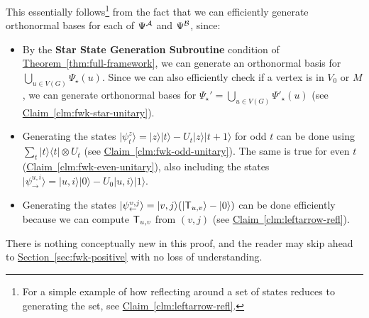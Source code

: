 \documentclass{article}
\renewcommand{\sec}[1]{\hyperref[sec:#1]{Section~\ref*{sec:#1}}}
\newcommand{\thm}[1]{\hyperref[thm:#1]{Theorem~\ref*{thm:#1}}}
\newcommand{\clm}[1]{\hyperref[clm:#1]{Claim~\ref*{clm:#1}}}
\def\ket#1{{\lvert}#1\rangle}
\def\bra#1{{\langle}#1\rvert}
\renewcommand{\>}{\rangle}
\newcommand{\<}{\langle}
\renewcommand{\(}{\left(}
\renewcommand{\)}{\right)}
\begin{document}
\noindent This essentially follows\footnote{For a simple example of how reflecting around a set of states reduces to generating the set, see \clm{leftarrow-refl}.} from the fact that we can efficiently generate orthonormal bases for each of $\Psi^{\cal A}$ and $\Psi^{\cal B}$, since:
\begin{itemize}
\item By the \textbf{Star State Generation Subroutine} condition of \thm{full-framework}, we can generate an orthonormal basis for $\bigcup_{u\in V(G)}\Psi_\star(u)$. Since we can also efficiently check if a vertex is in $V_0$ or $M$, we can generate orthonormal bases for $\Psi_\star'=\bigcup_{u\in V(G)}\Psi'_\star(u)$ (see \clm{fwk-star-unitary}).
\item Generating the states $\ket{\psi_t^z}=\ket{z}\ket{t}-U_t\ket{z}\ket{t+1}$ for odd $t$ can be done using $\sum_{t}\ket{t}\bra{t}\otimes U_t$ (see \clm{fwk-odd-unitary}). The same is true for even $t$ (\clm{fwk-even-unitary}), also including the states $\ket{\psi_{\rightarrow}^{u,i}}=\ket{u,i}\ket{0}-U_0\ket{u,i}\ket{1}$.
\item Generating the states $\ket{\psi_{\leftarrow}^{v,j}}=\ket{v,j}(\ket{{\sf T}_{u,v}}-\ket{0})$ can be done efficiently because we can compute ${\sf T}_{u,v}$ from $(v,j)$ (see \clm{leftarrow-refl}). 
\end{itemize}
There is nothing conceptually new in this proof, and the reader may skip ahead to \sec{fwk-positive} with no loss of understanding. 
\end{document}
